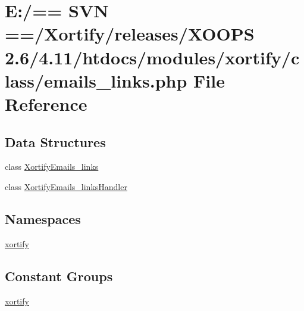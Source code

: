\hypertarget{emails__links_8php}{\section{E\-:/== S\-V\-N ==/\-Xortify/releases/\-X\-O\-O\-P\-S 2.6/4.11/htdocs/modules/xortify/class/emails\-\_\-links.php File Reference}
\label{emails__links_8php}
}
\subsection*{Data Structures}
\begin{DoxyCompactItemize}
\item 
class \hyperlink{class_xortify_emails__links}{Xortify\-Emails\-\_\-links}
\item 
class \hyperlink{class_xortify_emails__links_handler}{Xortify\-Emails\-\_\-links\-Handler}
\end{DoxyCompactItemize}
\subsection*{Namespaces}
\begin{DoxyCompactItemize}
\item 
\hyperlink{namespacexortify}{xortify}
\end{DoxyCompactItemize}
\subsection*{Constant Groups}
\begin{DoxyCompactItemize}
\item 
\hyperlink{namespacexortify}{xortify}
\end{DoxyCompactItemize}
